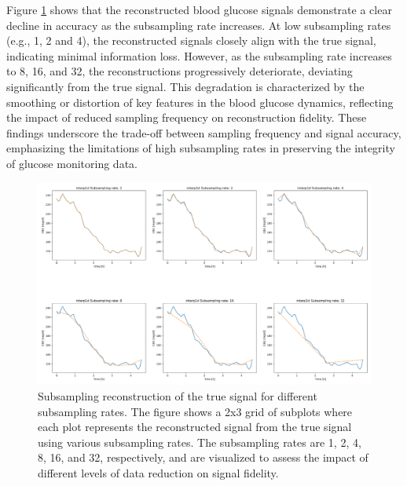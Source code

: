 Figure \ref{fig:SR_combined} shows that the reconstructed blood glucose signals demonstrate a clear decline in accuracy as the subsampling rate increases. At low subsampling rates (e.g., 1, 2 and 4), the reconstructed signals closely align with the true signal, indicating minimal information loss. However, as the subsampling rate increases to 8, 16, and 32, the reconstructions progressively deteriorate, deviating significantly from the true signal. This degradation is characterized by the smoothing or distortion of key features in the blood glucose dynamics, reflecting the impact of reduced sampling frequency on reconstruction fidelity. These findings underscore the trade-off between sampling frequency and signal accuracy, emphasizing the limitations of high subsampling rates in preserving the integrity of glucose monitoring data.
\begin{figure}[ht] %
	\centering
	\includegraphics[width=\textwidth]{Figures/SR_combined.png} %
	\caption{Subsampling reconstruction of the true signal for different subsampling rates. The figure shows a 2x3 grid of subplots where each plot represents the reconstructed signal from the true signal using various subsampling rates. The subsampling rates are 1, 2, 4, 8, 16, and 32, respectively, and are visualized to assess the impact of different levels of data reduction on signal fidelity.}
	\label{fig:SR_combined}  %
\end{figure}


